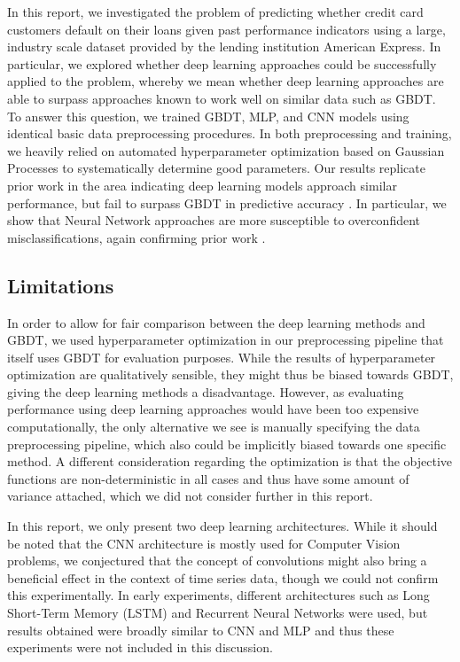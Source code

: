 \documentclass[runningheads]{llncs}
\begin{document}
In this report, we investigated the problem of predicting whether credit card customers default on their loans given past performance indicators using a large, industry scale dataset provided by the lending institution American Express.
In particular, we explored whether deep learning approaches could be successfully applied to the problem, whereby we mean whether deep learning approaches are able to surpass approaches known to work well on similar data such as GBDT. To answer this question, we trained GBDT, MLP, and CNN models using identical basic data preprocessing procedures. In both preprocessing and training, we heavily relied on automated hyperparameter optimization based on Gaussian Processes to systematically determine good parameters. Our results replicate prior work in the area indicating deep learning models approach similar performance, but fail to surpass GBDT in predictive accuracy \cite{alam2020investigation}. In particular, we show that Neural Network approaches are more susceptible to overconfident misclassifications, again confirming prior work \cite{abdar2021review}.


\subsection{Limitations}


In order to allow for fair comparison between the deep learning methods and GBDT, we used hyperparameter optimization in our preprocessing pipeline that itself uses GBDT for evaluation purposes. While the results of hyperparameter optimization are qualitatively sensible, they might thus be biased towards GBDT, giving the deep learning methods a disadvantage. However, as evaluating performance using deep learning approaches would have been too expensive computationally, the only alternative we see is manually specifying the data preprocessing pipeline, which also could be implicitly biased towards one specific method. A different consideration regarding the optimization is that the objective functions are non-deterministic in all cases and thus have some amount of variance attached, which we did not consider further in this report.

In this report, we only present two deep learning architectures. While it should be noted that the CNN architecture is mostly used for Computer Vision problems, we conjectured that the concept of convolutions might also bring a beneficial effect in the context of time series data, though we could not confirm this experimentally. In early experiments, different architectures such as Long Short-Term Memory (LSTM) and Recurrent Neural Networks were used, but results obtained were broadly similar to CNN and MLP and thus these experiments were not included in this discussion.
\end{document}
